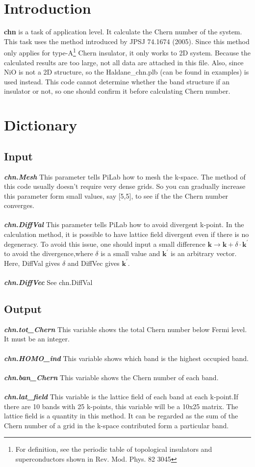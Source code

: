 \documentclass[10pt,a4paper]{article}
\begin{document}
\section{Introduction}
\textbf{chn} is a task of application level. It calculate the Chern number of the system. This task uses the method introduced by JPSJ 74.1674 (2005). Since this method only applies for type-A\footnote{For definition, see the periodic table of topological insulators and superconductors shown in Rev. Mod. Phys. 82 3045} Chern insulator, it only works to 2D system. Because the calculated results are too large, not all data are attached in this file. Also, since NiO is not a 2D structure, so the Haldane\_chn.plb (can be found in examples) is used instead. This code cannot determine whether the band structure if an insulator or not, so one should confirm it before calculating Chern number.  

\section{Dictionary}

\subsection{Input}
\textit{\textbf{chn.Mesh}} This parameter tells PiLab how to mesh the k-space. The method of this code usually doesn't require very dense grids. So you can gradually increase this parameter form small values, say [5,5], to see if the the Chern number converges.\\ \\
\textit{\textbf{chn.DiffVal}}  This parameter tells PiLab how to avoid divergent k-point. In the calculation method, it is possible to have lattice field divergent even if there is no degeneracy. To avoid this issue, one should input a small difference $\textbf{k}  \rightarrow \textbf{k}+ \delta \cdot \textbf{k}^{'}$ to avoid the divergence,where $\delta$ is a small value and $\textbf{k}^{'}$ is an arbitrary vector. Here, DiffVal gives $\delta$ and DiffVec gives $\textbf{k}^{'}$.\\ \\
\textit{\textbf{chn.DiffVec}} See chn.DiffVal    
\subsection{Output}
\textit{\textbf{chn.tot\_Chern}} This variable shows the total Chern number below Fermi level. It must be an integer.\\ \\
\textit{\textbf{chn.HOMO\_ind}} This variable shows which band is the highest occupied band. \\ \\
\textit{\textbf{chn.ban\_Chern}} This variable shows the Chern number of each band. \\ \\
\textit{\textbf{chn.lat\_field}} This variable is the lattice field of each band at each k-point.If there are 10 bands with 25 k-points, this variable will be a 10x25 matrix. The lattice field is a quantity in this method. It can be regarded as the sum of the Chern number of a grid in the k-space contributed form a particular band.  
\end{document}
